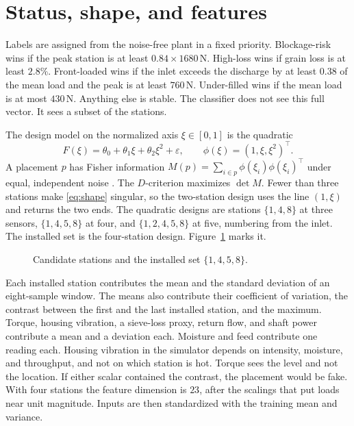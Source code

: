 \documentclass[11pt,a4paper]{article}
\begin{document}
\section{Status, shape, and features}

Labels are assigned from the noise-free plant in a fixed priority. Blockage-risk wins if the peak station is at least \(0.84\times 1680\,\mathrm{N}\). High-loss wins if grain loss is at least \(2.8\%\). Front-loaded wins if the inlet exceeds the discharge by at least \(0.38\) of the mean load and the peak is at least \(760\,\mathrm{N}\). Under-filled wins if the mean load is at most \(430\,\mathrm{N}\). Anything else is stable. The classifier does not see this full vector. It sees a subset of the stations.

The design model on the normalized axis \(\xi\in[0,1]\) is the quadratic
\begin{equation}
F(\xi)=\theta_0+\theta_1\xi+\theta_2\xi^2+\varepsilon,
\qquad
\phi(\xi)=(1,\xi,\xi^2)^\top.
\label{eq:shape}
\end{equation}
A placement \(p\) has Fisher information \(M(p)=\sum_{i\in p}\phi(\xi_i)\phi(\xi_i)^\top\) under equal, independent noise \cite{atkinson2007}. The \(D\)-criterion maximizes \(\det M\). Fewer than three stations make \eqref{eq:shape} singular, so the two-station design uses the line \((1,\xi)\) and returns the two ends. The quadratic designs are stations \(\{1,4,8\}\) at three sensors, \(\{1,4,5,8\}\) at four, and \(\{1,2,4,5,8\}\) at five, numbering from the inlet. The installed set is the four-station design. Figure~\ref{fig:stations} marks it.

\begin{figure}[ht]
\centering
{}
\caption{Candidate stations and the installed set \(\{1,4,5,8\}\).}
\label{fig:stations}
\end{figure}

Each installed station contributes the mean and the standard deviation of an eight-sample window. The means also contribute their coefficient of variation, the contrast between the first and the last installed station, and the maximum. Torque, housing vibration, a sieve-loss proxy, return flow, and shaft power contribute a mean and a deviation each. Moisture and feed contribute one reading each. Housing vibration in the simulator depends on intensity, moisture, and throughput, and not on which station is hot. Torque sees the level and not the location. If either scalar contained the contrast, the placement would be fake. With four stations the feature dimension is \(23\), after the scalings that put loads near unit magnitude. Inputs are then standardized with the training mean and variance.
\end{document}
